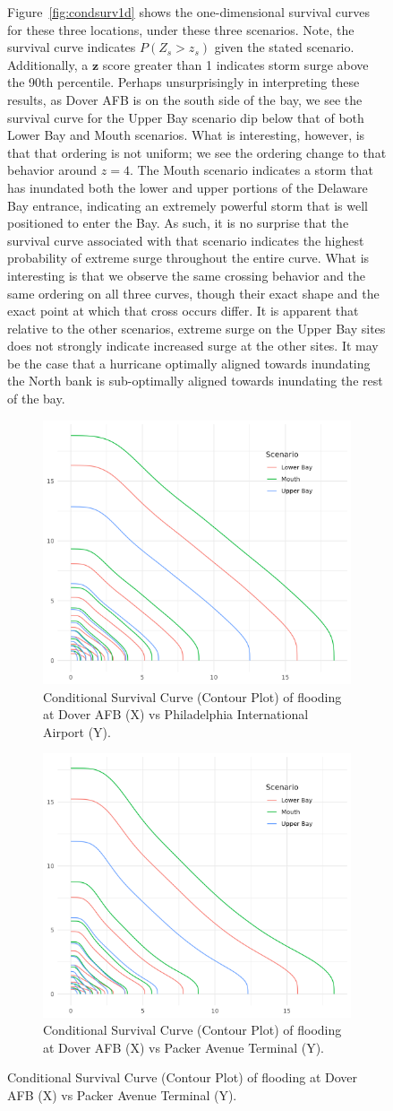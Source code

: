 \begin{figure}[ht]
Figure~\ref{fig:condsurv1d} shows the one-dimensional survival curves for these three locations, under 
    these three scenarios.  Note, the survival curve indicates $P(Z_s > z_s)$ given the stated scenario.
    Additionally, a $\bm{z}$ score greater than 1 indicates storm surge above the 90th percentile.
    Perhaps unsurprisingly in interpreting these results, as Dover AFB is on the south side of the bay, 
    we see the survival curve for the Upper Bay scenario dip below that of both Lower Bay and Mouth scenarios.  
    What is interesting, however, is that that ordering is not uniform; we see the ordering change to that
    behavior around $z = 4$.  The Mouth scenario indicates a storm that has inundated both the lower and
    upper portions of the Delaware Bay entrance, indicating an extremely powerful storm that is well positioned
    to enter the Bay.  As such, it is no surprise that the survival curve associated with that scenario
    indicates the highest probability of extreme surge throughout the entire curve.  What is interesting is that
    we observe the same crossing behavior and the same ordering on all three curves, though their exact shape
    and the exact point at which that cross occurs differ.  It is apparent that relative to the other
    scenarios, extreme surge on the Upper Bay sites does not strongly indicate increased surge at the other 
    sites.  It may be the case that a hurricane optimally aligned towards inundating the North bank is 
    sub-optimally aligned towards inundating the rest of the bay.

\begin{figure}[htb]
    \centering
    \includegraphics[width=0.3\linewidth]{./plots/condsurv/doverafb_pia}
    \caption{Conditional Survival Curve (Contour Plot) of flooding at Dover AFB (X) vs Philadelphia International 
        Airport (Y).\label{fig:condsurv2d:doverpia}
        }
\end{figure}

\begin{figure}[htb]
    \centering
    \includegraphics[width=0.3\linewidth]{./plots/condsurv/doverafb_packer}
    \caption{Conditional Survival Curve (Contour Plot) of flooding at Dover AFB (X) vs Packer Avenue Terminal (Y).
        \label{fig:condsurv2d:doverpacker}
        }
\end{figure}


\end{figure}
